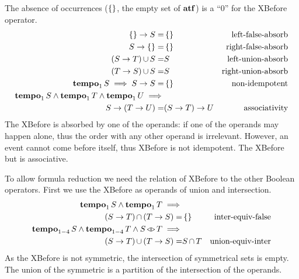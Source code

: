 \documentclass[12pt,openright,twoside,a4paper,oldfontcommands,english,brazil,draft]{abntex2}
\theoremstyle{theo}
\def\xbeforeop{\ensuremath\rightarrow}
\newcommand{\xbefore}[2]{\ensuremath #1 \xbeforeop #2 }
\def\tempoop{\ensuremath\operatorname{\mathbf{tempo}}}
\newcommand{\tempo}[2][1-4]{\ensuremath\tempoop_{#1} #2}
\def\independenteventsop{\ensuremath\operatorname{\triangleleft\triangleright}}
\newcommand{\independentevents}[2]{\ensuremath #1 \independenteventsop #2}
\def\False{\ensuremath\operatorname{\left\{\right\}}}
\def\algebraset{\ensuremath\operatorname{\mathbf{atf}}}
\newcommand{\parsin}[1]{\ensuremath\left( #1 \right)}
\def\union{\ensuremath\operatorname{\cup}}
\def\inter{\ensuremath\operatorname{\cap}}
\begin{document}
The absence of occurrences ($\False$, the empty set of $\algebraset$) is a ``0'' for the XBefore operator.
%
\begin{subequations}
\begin{align}
\xbefore{\False}{S} =&
  \False &
  \text{left-false-absorb}
  \label{thm:xbefore-of-false-1}\\
%
\xbefore{S}{\False} =&
  \False &
  \text{right-false-absorb}
  \label{thm:xbefore-of-false-2}\\
%
\left(\xbefore{S}{T}\right) \union S =& S &
  \text{left-union-absorb}
  \label{thm:xbefore-sup-absorb-1}\\
%
\left(\xbefore{T}{S}\right) \union S =& S &
  \text{right-union-absorb}
  \label{thm:xbefore-sup-absorb-2}\\
%
\tempo[1]{S} \implies
  \xbefore{S}{S} =&
  \False &
  \text{non-idempotent}
  \label{thm:xbefore-not-idempotent}\\
%
\tempo[1]{S}\land\tempo[1]{T}\land \tempo[1]{U}\implies&\nonumber\\
  \xbefore{S}{(\xbefore{T}{U})} =&
  \xbefore{(\xbefore{S}{T})}{U} &
  \text{associativity}
%
\end{align}
\end{subequations}
%
The XBefore is absorbed by one of the operands: if one of the operands may happen alone, thus the order with any other operand is irrelevant.
However, an event cannot come before itself, thus XBefore is not idempotent.
The XBefore but is associative.

To allow formula reduction we need the relation of XBefore to the other Boolean operators.
First we use the XBefore as operands of union and intersection.
%
\begin{subequations}
\begin{align}
\tempo[1]{S} \land \tempo[1]{T}\implies&\nonumber\\
  \parsin{\xbefore{S}{T}} \inter \parsin{\xbefore{T}{S}} =&
  \False &
  \text{inter-equiv-false}
  \label{thm:xbefore-inf-equiv-bot}\\
%
\tempo{S} \land \tempo{T} \land \independentevents{S}{T}\implies&\nonumber\\
  \parsin{\xbefore{S}{T}} \union \parsin{\xbefore{T}{S}} =&
  S \inter T &
  \text{union-equiv-inter}
  \label{thm:xbefore-sup-equiv-inf}
%
\end{align}
\end{subequations}
%
As the XBefore is not symmetric, the intersection of symmetrical sets is empty.
The union of the symmetric is a partition of the intersection of the operands.
\end{document}
